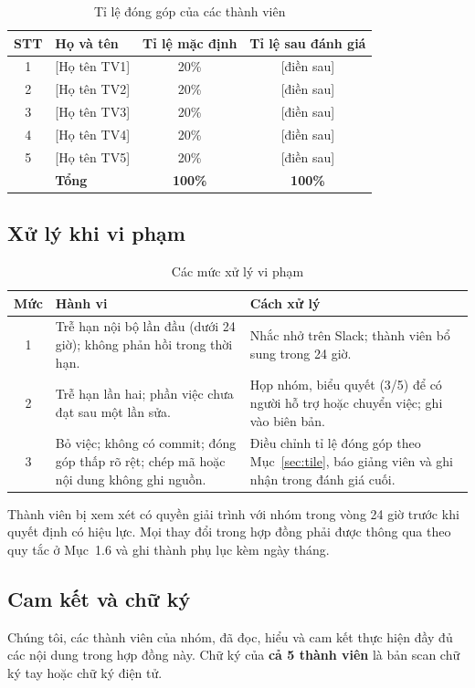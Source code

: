 \documentclass[13pt,a4paper]{extarticle}
\makeatletter
\newcommand{\todo}[1]{\textcolor{todored}{[#1]}}
\newcommand{\tvA}{\todo{Họ tên TV1}} \newcommand{\mssvA}{\todo{MSSV}} \newcommand{\mailA}{\todo{MSSV}@gm.uit.edu.vn}
\newcommand{\tvB}{\todo{Họ tên TV2}} \newcommand{\mssvB}{\todo{MSSV}} \newcommand{\mailB}{\todo{MSSV}@gm.uit.edu.vn}
\newcommand{\tvC}{\todo{Họ tên TV3}} \newcommand{\mssvC}{\todo{MSSV}} \newcommand{\mailC}{\todo{MSSV}@gm.uit.edu.vn}
\newcommand{\tvD}{\todo{Họ tên TV4}} \newcommand{\mssvD}{\todo{MSSV}} \newcommand{\mailD}{\todo{MSSV}@gm.uit.edu.vn}
\newcommand{\tvE}{\todo{Họ tên TV5}} \newcommand{\mssvE}{\todo{MSSV}} \newcommand{\mailE}{\todo{MSSV}@gm.uit.edu.vn}
\makeatother
\begin{document}
\begin{table}[H]
\centering
\begin{tabularx}{\linewidth}{@{}c X c c@{}}
\toprule
\textbf{STT} & \textbf{Họ và tên} & \textbf{Tỉ lệ mặc định} & \textbf{Tỉ lệ sau đánh giá}\\
\midrule
1 & \tvA & 20\% & \todo{điền sau}\\
2 & \tvB & 20\% & \todo{điền sau}\\
3 & \tvC & 20\% & \todo{điền sau}\\
4 & \tvD & 20\% & \todo{điền sau}\\
5 & \tvE & 20\% & \todo{điền sau}\\
\midrule
 & \textbf{Tổng} & \textbf{100\%} & \textbf{100\%}\\
\bottomrule
\end{tabularx}
\caption{Tỉ lệ đóng góp của các thành viên}
\end{table}

\subsection{Xử lý khi vi phạm}
\begin{table}[H]
\centering\small
\begin{tabularx}{\linewidth}{@{}c X X@{}}
\toprule
\textbf{Mức} & \textbf{Hành vi} & \textbf{Cách xử lý}\\
\midrule
1 & Trễ hạn nội bộ lần đầu (dưới 24 giờ); không phản hồi trong thời hạn. & Nhắc nhở trên Slack; thành viên bổ sung trong 24 giờ.\\
2 & Trễ hạn lần hai; phần việc chưa đạt sau một lần sửa. & Họp nhóm, biểu quyết (3/5) để có người hỗ trợ hoặc chuyển việc; ghi vào biên bản.\\
3 & Bỏ việc; không có commit; đóng góp thấp rõ rệt; chép mã hoặc nội dung không ghi nguồn. & Điều chỉnh tỉ lệ đóng góp theo Mục~\ref{sec:tile}, báo giảng viên và ghi nhận trong đánh giá cuối.\\
\bottomrule
\end{tabularx}
\caption{Các mức xử lý vi phạm}
\end{table}
Thành viên bị xem xét có quyền giải trình với nhóm trong vòng 24 giờ trước khi quyết định có hiệu lực. Mọi thay đổi trong hợp đồng phải được thông qua theo quy tắc ở Mục~1.6 và ghi thành phụ lục kèm ngày tháng.

\subsection{Cam kết và chữ ký}
Chúng tôi, các thành viên của nhóm, đã đọc, hiểu và cam kết thực hiện đầy đủ các nội dung trong hợp đồng này. Chữ ký của \textbf{cả 5 thành viên} là bản scan chữ ký tay hoặc chữ ký điện tử.
\end{document}
